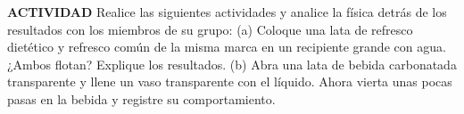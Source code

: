 \item \textbf{ACTIVIDAD} Realice las siguientes actividades y analice la física detrás de los resultados con los miembros de su grupo: (a) Coloque una lata de refresco dietético y refresco común de la misma marca en un recipiente grande con agua. ¿Ambos flotan? Explique los resultados. (b) Abra una lata de bebida carbonatada transparente y llene un vaso transparente con el líquido. Ahora vierta unas pocas pasas en la bebida y registre su comportamiento.
